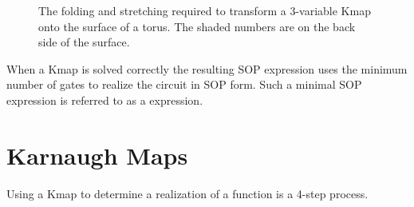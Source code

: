 \begin{figure}[ht]
\caption{The folding and stretching required to transform
a 3-variable Kmap onto the surface of a torus.  The shaded
numbers are on the back side of the surface.}
\label{fig:minimizationTorus}
\end{figure}

When a Kmap is solved correctly the resulting SOP expression
uses the minimum number of gates to realize the circuit 
in SOP form.  Such a minimal SOP expression is referred 
to as a \SOPmin {} expression.

\section{Karnaugh Maps}
Using a Kmap to determine a \SOPmin realization of a function
is a 4-step process. 

